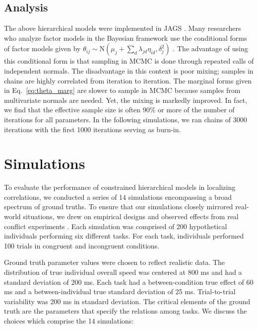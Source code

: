 \documentclass[man, 12pt]{apa7} %
\begin{document}
\subsection{Analysis}

The above hierarchical models were implemented in JAGS \parencite[]{Plummer.2003}.  Many researchers who analyze factor models in the Bayesian framework use the conditional forms of factor models given by $\theta_{ij} \sim \mbox{N}(\mu_j+\sum_d\lambda_{jd}\eta_{id},\delta_j^2)$ \parencite[e.g.][]{Ghosh.Dunson.2009}.  The advantage of using this conditional form is that sampling in MCMC is done through repeated calls of independent normals.  The disadvantage in this context is poor mixing; samples in chains are highly correlated from iteration to iteration.  The marginal forms given in Eq.~\ref{eq:theta_marg} are slower to sample in MCMC because samples from multivariate normals are needed.  Yet, the mixing is markedly improved.  In fact, we find that the effective sample size is often 90\% or more of the number of iterations for all parameters.  In the following simulations, we ran chains of 3000 iterations with the first 1000 iterations serving as burn-in.

\section{Simulations}


To evaluate the performance of constrained hierarchical models in localizing correlations, we conducted a series of 14 simulations encompassing a broad spectrum of ground truths. To ensure that our simulations closely mirrored real-world situations, we drew on empirical designs and observed effects from real conflict experiments \parencite[see][]{Rouder.etal.2024}. Each simulation was comprised of 200 hypothetical individuals performing six different tasks. For each task, individuals performed 100 trials in congruent and incongruent conditions.

Ground truth parameter values were chosen to reflect realistic data. The distribution of true individual overall speed was centered at 800 ms and had a standard deviation of 200 ms. Each task had a between-condition true effect of 60 ms and a between-individual true standard deviation of 25 ms. Trial-to-trial variability was 200 ms in standard deviation.
The critical elements of the ground truth are the parameters that specify the relations among tasks.  We discuss the choices which comprise the 14 simulations:
\end{document}
